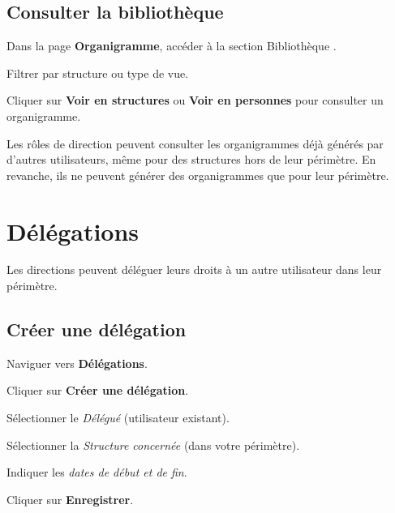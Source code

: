 \subsection{Consulter la biblioth\`eque}

\begin{steps}
  \item Dans la page \textbf{Organigramme}, acc\'eder \`a la section \og Biblioth\`eque \fg{}.
  \item Filtrer par structure ou type de vue.
  \item Cliquer sur \textbf{Voir en structures} ou \textbf{Voir en personnes} pour consulter un organigramme.
\end{steps}

\begin{notebox}
  Les r\^oles de direction peuvent consulter les organigrammes d\'ej\`a g\'en\'er\'es par d'autres utilisateurs, m\^eme pour des structures hors de leur p\'erim\`etre. En revanche, ils ne peuvent g\'en\'erer des organigrammes que pour leur p\'erim\`etre.
\end{notebox}

\section{D\'el\'egations}

Les directions peuvent d\'el\'eguer leurs droits \`a un autre utilisateur dans leur p\'erim\`etre.

\subsection{Cr\'eer une d\'el\'egation}

\begin{steps}
  \item Naviguer vers \textbf{D\'el\'egations}.
  \item Cliquer sur \textbf{Cr\'eer une d\'el\'egation}.
  \item S\'electionner le \textit{D\'el\'egu\'e} (utilisateur existant).
  \item S\'electionner la \textit{Structure concern\'ee} (dans votre p\'erim\`etre).
  \item Indiquer les \textit{dates de d\'ebut et de fin}.
  \item Cliquer sur \textbf{Enregistrer}.
\end{steps}


